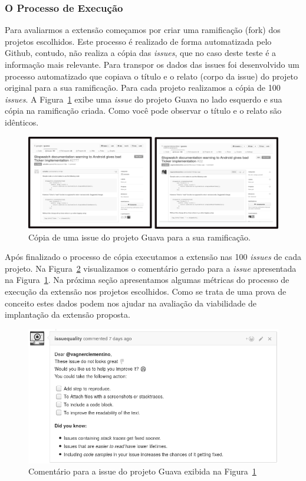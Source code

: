 \subsubsection{O Processo de Execução}
\label{sub:implementacao_processo_execucao}

Para avaliarmos a extensão começamos por criar uma ramificação (fork) dos
projetos escolhidos. Este processo é realizado de forma automatizada pelo
Github, contudo, não realiza a cópia das \textit{issues}, que no caso deste
teste é a informação mais relevante. Para transpor os dados das issues foi
desenvolvido um processo automatizado que copiava o título e o relato (corpo da
issue) do projeto original para a sua ramificação. Para cada projeto realizamos
a cópia de 100 \textit{issues}. A Figura~\ref{fig:copia-de-issues} exibe uma
\textit{issue} do projeto Guava no lado esquerdo e sua cópia na ramificação
criada. Como você pode observar o título e o relato são idênticos.

\begin{figure}[htpb]
    \centering
    \includegraphics[width=1.1\linewidth]{chapter-implementacao-extensoes-fgrm/img/copia-de-issues.png}
    \caption{Cópia de uma issue do projeto Guava para a sua ramificação.}
\label{fig:copia-de-issues}
\end{figure}

Após finalizado o processo de cópia executamos a extensão nas 100
\textit{issues} de cada projeto. Na Figura~\ref{fig:exemplo_comentario_issue}
visualizamos o comentário gerado para a \textit{issue} apresentada na
Figura~\ref{fig:copia-de-issues}. Na próxima seção apresentamos algumas métricas
do processo de execução da extensão nos projetos escolhidos. Como se trata de
uma prova de conceito estes dados podem nos ajudar na avaliação da viabilidade
de implantação da extensão proposta.

\begin{figure}[htpb]
    \centering
    \includegraphics[width=0.7\linewidth]{chapter-implementacao-extensoes-fgrm/img/exemplo_comentario_issue.png}
    \caption{Comentário para a issue do projeto Guava exibida na Figura~\ref{fig:copia-de-issues}}
\label{fig:exemplo_comentario_issue}
\end{figure}

